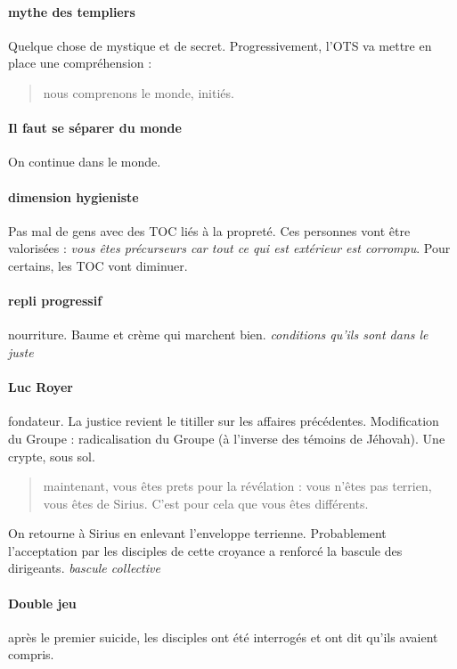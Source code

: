 \paragraph{mythe des templiers} Quelque chose de mystique et de secret. Progressivement, l'OTS va mettre en place une compréhension : 
\begin{quote}
    nous comprenons le monde, initiés.
\end{quote}

\paragraph{Il faut se séparer du monde} On continue dans le monde. 

\paragraph{dimension hygieniste} Pas mal de gens avec des TOC liés à la propreté. Ces personnes vont être valorisées : \textit{vous êtes précurseurs car tout ce qui est extérieur est corrompu}. Pour certains, les TOC vont diminuer.

\paragraph{repli progressif} nourriture. Baume et crème qui marchent bien. \textit{conditions qu'ils sont dans le juste}

\paragraph{Luc Royer} fondateur. La justice revient le titiller sur les affaires précédentes. Modification du Groupe : radicalisation du Groupe (à l'inverse des témoins de Jéhovah). Une crypte, sous sol.
\begin{quote}
    {maintenant, vous êtes prets pour la révélation : vous n'êtes pas terrien, vous êtes de Sirius}. C'est pour cela que vous êtes différents.
\end{quote}
On retourne à Sirius en enlevant l'enveloppe terrienne. Probablement l'acceptation par les disciples de cette croyance a renforcé la bascule des dirigeants. \textit{bascule collective}

\paragraph{Double jeu} après le premier suicide, les disciples ont été interrogés et ont dit qu'ils avaient compris. 


